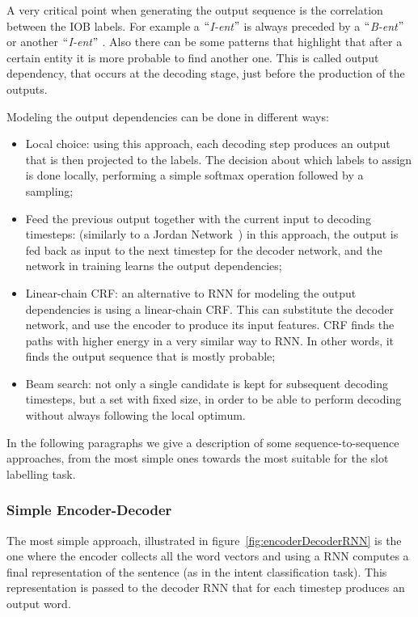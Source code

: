 A very critical point when generating the output sequence is the correlation between the IOB labels. For example a $``$\textit{I-ent}$"$  is always preceded by a $``$\textit{B-ent}$"$  or another $``$\textit{I-ent}$"$ . Also there can be some patterns that highlight that after a certain entity it is more probable to find another one. This is called output dependency, that occurs at the decoding stage, just before the production of the outputs. 

Modeling the output dependencies can be done in different ways:

\begin{itemize}
	\item Local choice: using this approach, each decoding step produces an output that is then projected to the labels. The decision about which labels to assign is done locally, performing a simple softmax operation followed by a sampling;

	\item Feed the previous output together with the current input to decoding timesteps: (similarly to a Jordan Network~\cite{jordan1997serial}) in this approach, the output is fed back as input to the next timestep for the decoder network, and the network in training learns the output dependencies;

	\item Linear-chain CRF: an alternative to RNN for modeling the output dependencies is using a linear-chain CRF. This can substitute the decoder network, and use the encoder to produce its input features. CRF finds the paths with higher energy in a very similar way to RNN. In other words, it finds the output sequence that is mostly probable;

	\item Beam search: not only a single candidate is kept for subsequent decoding timesteps, but a set with fixed size, in order to be able to perform decoding without always following the local optimum.
\end{itemize}

In the following paragraphs we give a description of some sequence-to-sequence approaches, from the most simple ones towards the most suitable for the slot labelling task.

\subsubsection{Simple Encoder-Decoder}
The most simple approach, illustrated in figure~\ref{fig:encoderDecoderRNN} is the one where the encoder collects all the word vectors and using a RNN computes a final representation of the sentence (as in the intent classification task). This representation is passed to the decoder RNN that for each timestep produces an output word.

